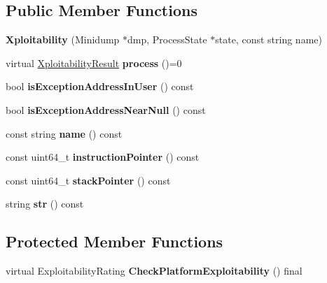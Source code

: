 \subsection*{Public Member Functions}
\begin{DoxyCompactItemize}
\item 
\mbox{\label{classsl2_1_1_xploitability_aeb4e8678ff306d686832cb08cbb45b88}} 
{\bfseries Xploitability} (Minidump $\ast$dmp, Process\+State $\ast$state, const string name)
\item 
\mbox{\label{classsl2_1_1_xploitability_a2b888a7df84ea86b22f9f55f21fcf32b}} 
virtual \mbox{\hyperlink{classsl2_1_1_xploitability_result}{Xploitability\+Result}} {\bfseries process} ()=0
\item 
\mbox{\label{classsl2_1_1_xploitability_a8742132e68c65157ee0402f74402fd65}} 
bool {\bfseries is\+Exception\+Address\+In\+User} () const
\item 
\mbox{\label{classsl2_1_1_xploitability_a55a796ee9d82069ce57d9148aa1d1503}} 
bool {\bfseries is\+Exception\+Address\+Near\+Null} () const
\item 
\mbox{\label{classsl2_1_1_xploitability_a5d91c614201e7dfb3686308cdd95fb44}} 
const string {\bfseries name} () const
\item 
\mbox{\label{classsl2_1_1_xploitability_a913a77b9a761815c716b6b95c09c5912}} 
const uint64\+\_\+t {\bfseries instruction\+Pointer} () const
\item 
\mbox{\label{classsl2_1_1_xploitability_adee9012150396d931abf8b49b9946840}} 
const uint64\+\_\+t {\bfseries stack\+Pointer} () const
\item 
\mbox{\label{classsl2_1_1_xploitability_af386972eeff5508ffb320dabac132cc7}} 
string {\bfseries str} () const
\end{DoxyCompactItemize}
\subsection*{Protected Member Functions}
\begin{DoxyCompactItemize}
\item 
\mbox{\label{classsl2_1_1_xploitability_ae2af1d4955638e945af6c76fe1dbc5e5}} 
virtual Exploitability\+Rating {\bfseries Check\+Platform\+Exploitability} () final
\end{DoxyCompactItemize}
